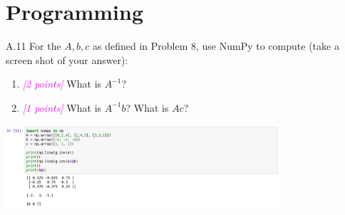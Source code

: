 \documentclass{article}
\newcommand{\1}{\mathbf{1}}
\newcommand{\points}[1]{\small\textcolor{magenta}{\emph{[#1 points]}} \normalsize}
\begin{document}
\section*{Programming}

A.11 For the $A, b, c$ as defined in Problem 8, use
  NumPy to compute (take a screen shot of your answer):
  \begin{enumerate}
  \item \points{2} What is $A^{-1}$?
  \item \points{1} What is $A^{-1}b$? What is $Ac$?
  \end{enumerate}  
  
    \begin{center}
    \includegraphics[width=4in]{HW0_plots/numpy.png}
    \end{center} 
\end{document}
